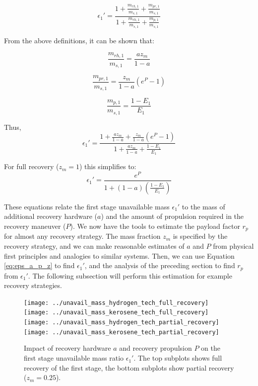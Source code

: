 \documentclass[conf]{new-aiaa}
\begin{document}
\begin{equation}
\epsilon_1' = \frac{1 + \frac{m_{rh,1}}{m_{s,1}} + \frac{m_{pr,1}}{m_{s,1}} }{1 + \frac{m_{rh,1}}{m_{s,1}} + \frac{m_{p,1}}{m_{s,1}} }
\end{equation}

From the above definitions, it can be shown that:

\begin{equation}
\frac{m_{rh,1}}{m_{s,1}} = \frac{a z_m}{1 - a}
\end{equation}

\begin{equation}
\frac{m_{pr,1}}{m_{s,1}} = \frac{z_m}{1 - a} (e^P - 1)
\end{equation}

\begin{equation}
\frac{m_{p,1}}{m_{s,1}} = \frac{1 - E_1}{E_1}
\end{equation}

Thus,
\begin{equation}
\label{eq:eps_a_p_z}
\epsilon_1' = \frac{1 + \frac{a z_m}{1 - a} +  \frac{z_m}{1 - a} (e^P - 1) }{1 + \frac{a z_m}{1 - a} + \frac{1 - E_1}{E_1} }
\end{equation}

For full recovery ($z_m = 1$) this simplifies to:
\begin{equation}
\epsilon_1' = \frac{e^P}{1 + (1 - a) \left( \frac{1 - E_1}{E_1} \right)}
\end{equation}

These equations relate the first stage unavailable mass $\epsilon_1'$ to the mass of additional recovery hardware ($a$) and the amount of propulsion required in the recovery maneuver ($P$). We now have the tools to estimate the payload factor $r_p$ for almost any recovery strategy. The mass fraction $z_m$ is specified by the recovery strategy, and we can make reasonable estimates of $a$ and $P$ from physical first principles and analogies to similar systems. Then, we can use Equation \ref{eq:eps_a_p_z} to find $\epsilon_1'$, and the analysis of the preceding section to find $r_p$ from $\epsilon_1'$. The following subsection will perform this estimation for example recovery strategies.

\begin{figure}[hbt!]
	\centering
	\texttt{[image: ../unavail\_mass\_hydrogen\_tech\_full\_recovery]}
	\texttt{[image: ../unavail\_mass\_kerosene\_tech\_full\_recovery]}
	\texttt{[image: ../unavail\_mass\_hydrogen\_tech\_partial\_recovery]}
	\texttt{[image: ../unavail\_mass\_kerosene\_tech\_partial\_recovery]}
	\caption{\label{fig:unavail_mass} Impact of recovery hardware $a$ and recovery propulsion $P$ on the first stage unavailable mass ratio $\epsilon_1'$. The top subplots shows full recovery of the first stage, the bottom subplots show partial recovery ($z_m=0.25$).}
\end{figure}
\end{document}
